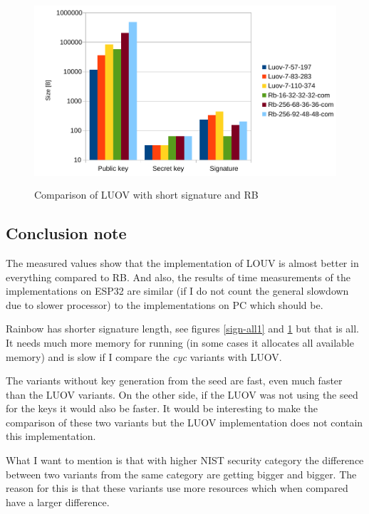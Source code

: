 \documentclass[thesis=M,english]{FITthesis}[2019/12/23]
\begin{document}
\bigskip\bigskip\bigskip
\begin{figure}[H]
\centering
\includegraphics[width=13cm,height=7cm]{images/mem-sign-all2.pdf}
\caption{Comparison of LUOV with short signature and RB}
\label{sign-all2}
\end{figure}

\newpage
\subsection{Conclusion note}
The measured values show that the implementation of LOUV is almost better in everything compared to RB. And also, the results of time measurements of the implementations on ESP32 are similar (if I do not count the general slowdown due to slower processor) to the implementations on PC which should be.

\bigskip
\noindent
Rainbow has shorter signature length, see figures \ref{sign-all1} and \ref{sign-all2} but that is all. It needs much more memory for running (in some cases it allocates all available memory) and is slow if I compare the \textit{cyc} variants with LUOV.

\bigskip
\noindent
The variants without key generation from the seed are fast, even much faster than the LUOV variants. On the other side, if the LUOV was not using the seed for the keys it would also be faster. It would be interesting to make the comparison of these two variants but the LUOV implementation does not contain this implementation.

\bigskip
\noindent
What I want to mention is that with higher NIST security category the difference between two variants from the same category are getting bigger and bigger. The reason for this is that these variants use more resources which when compared have a larger difference.

\newpage
\end{document}
